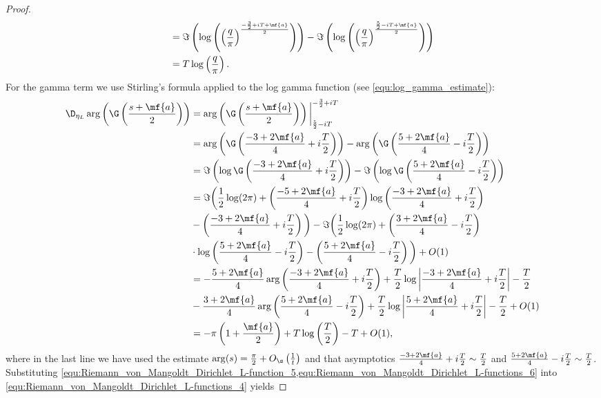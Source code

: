 \begin{proof}
\begin{equation}
\begin{aligned}
            &= \Im\left(\log\left(\left(\frac{q}{\pi}\right)^{\frac{-\frac{3}{2}+iT+\mf{a}}{2}}\right)\right)-\Im\left(\log\left(\left(\frac{q}{\pi}\right)^{\frac{\frac{5}{2}-iT+\mf{a}}{2}}\right)\right) \\
            &= T\log\left(\frac{q}{\pi}\right).
          \end{aligned}            
        \end{equation}
        For the gamma term we use Stirling's formula applied to the log gamma function (see \cref{equ:log_gamma_estimate}):
        \begin{equation}\label{equ:Riemann_von_Mangoldt_Dirichlet_L-functions_6}
          \begin{aligned}
            \D_{\eta_{L}}\arg\left(\G\left(\frac{s+\mf{a}}{2}\right)\right) &= \arg\left(\G\left(\frac{s+\mf{a}}{2}\right)\right)\bigg|_{\frac{5}{2}-iT}^{-\frac{3}{2}+iT} \\
            &= \arg\left(\G\left(\frac{-3+2\mf{a}}{4}+i\frac{T}{2}\right)\right)-\arg\left(\G\left(\frac{5+2\mf{a}}{4}-i\frac{T}{2}\right)\right) \\
            &= \Im\left(\log\G\left(\frac{-3+2\mf{a}}{4}+i\frac{T}{2}\right)\right)-\Im\left(\log\G\left(\frac{5+2\mf{a}}{4}-i\frac{T}{2}\right)\right) \\
            &= \Im\bigg(\frac{1}{2}\log(2\pi)+\left(\frac{-5+2\mf{a}}{4}+i\frac{T}{2}\right)\log\left(\frac{-3+2\mf{a}}{4}+i\frac{T}{2}\right) \\
            &- \left(\frac{-3+2\mf{a}}{4}+i\frac{T}{2}\right)\bigg)-\Im\bigg(\frac{1}{2}\log(2\pi)+\left(\frac{3+2\mf{a}}{4}-i\frac{T}{2}\right) \\
            &\cdot \log\left(\frac{5+2\mf{a}}{4}-i\frac{T}{2}\right)-\left(\frac{5+2\mf{a}}{4}-i\frac{T}{2}\right)\bigg)+O(1) \\
            &= -\frac{5+2\mf{a}}{4}\arg\left(\frac{-3+2\mf{a}}{4}+i\frac{T}{2}\right)+\frac{T}{2}\log\left|\frac{-3+2\mf{a}}{4}+i\frac{T}{2}\right|-\frac{T}{2} \\
            &- \frac{3+2\mf{a}}{4}\arg\left(\frac{5+2\mf{a}}{4}-i\frac{T}{2}\right)+\frac{T}{2}\log\left|\frac{5+2\mf{a}}{4}+i\frac{T}{2}\right|-\frac{T}{2}+O(1) \\
            &= -\pi\left(1+\frac{\mf{a}}{2}\right)+T\log\left(\frac{T}{2}\right)-T+O(1),
          \end{aligned}
        \end{equation}
        where in the last line we have used the estimate $\arg(s) = \frac{\pi}{2}+O_{\s}\left(\frac{1}{t}\right)$ and that asymptotics $\frac{-3+2\mf{a}}{4}+i\frac{T}{2} \sim \frac{T}{2}$ and $\frac{5+2\mf{a}}{4}-i\frac{T}{2} \sim \frac{T}{2}$. Substituting \cref{equ:Riemann_von_Mangoldt_Dirichlet_L-function_5,equ:Riemann_von_Mangoldt_Dirichlet_L-functions_6} into \cref{equ:Riemann_von_Mangoldt_Dirichlet_L-functions_4} yields

\end{proof}
